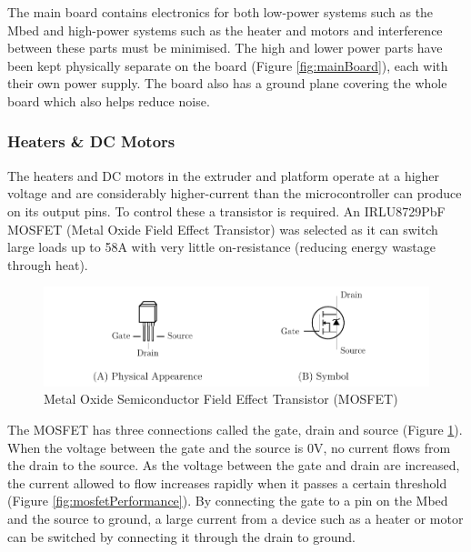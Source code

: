 				The main board contains electronics for both low-power systems such as
				the Mbed and high-power systems such as the heater and motors and
				interference between these parts must be minimised. The high and lower
				power parts have been kept physically separate on the board (Figure
				\ref{fig:mainBoard}), each with their own power supply. The board also
				has a ground plane covering the whole board which also helps reduce
				noise\cite{pcb_design_notes}.
			
			\subsubsection{Heaters \& DC Motors}
				
				
				The heaters and DC motors in the extruder and platform operate at a
				higher voltage and are considerably higher-current than the
				microcontroller can produce on its output pins. To control these a
				transistor is required.  An IRLU8729PbF MOSFET (Metal Oxide Field Effect
				Transistor) was selected as it can switch large loads up to 58A with
				very little on-resistance (reducing energy wastage through
				heat)\cite{MOSFET}.
				
				\begin{figure}
					\includegraphics[width=1\textwidth]{diagrams/mosfetDiagram.pdf}
					\caption{Metal Oxide Semiconductor Field Effect Transistor (MOSFET)}
					\label{fig:mosfetDiagram}
				\end{figure}
				
				The MOSFET has three connections called the gate, drain and source
				(Figure \ref{fig:mosfetDiagram}). When the voltage between the gate and
				the source is 0V, no current flows from the drain to the source. As the
				voltage between the gate and drain are increased, the current allowed to
				flow increases rapidly when it passes a certain threshold (Figure
				\ref{fig:mosfetPerformance}). By connecting the gate to a pin on the
				Mbed and the source to ground, a large current from a device such as a
				heater or motor can be switched by connecting it through the drain to
				ground.
				
